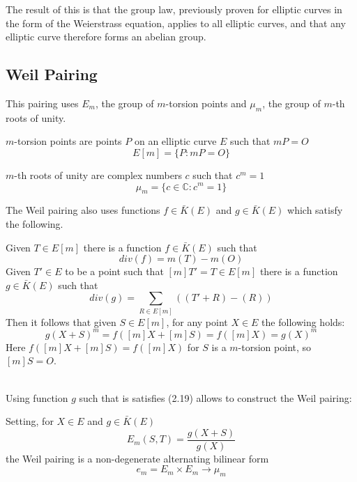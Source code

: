 The result of this is that the group law, previously proven for elliptic curves in the form of the Weierstrass equation, applies to all elliptic curves, and that any elliptic curve therefore forms an abelian group.

\subsection{Weil Pairing}
This pairing uses $E_m$, the group of $m$-torsion points and $\mu_m$, the group of $m$-th roots of unity.
\begin{defn}
	$m$-torsion points are points $P$ on an elliptic curve $E$ such that $mP=O$
	\begin{equation*}
	E[m]=\{P:mP=O\}
	\end{equation*}
\end{defn}
\begin{defn}
	$m$-th roots of unity are complex numbers $c$ such that $c^m=1$
	\begin{equation*}
	\mu_m=\{c\in\mathbb{C}:c^m=1\}
	\end{equation*}
\end{defn}
The Weil pairing also uses functions $f\in\bar{K}(E)$ and $g\in\bar{K}(E)$ which satisfy the following.
\begin{defn}
	Given $T\in E[m]$ there is a function $f\in\bar{K}(E)$ such that
	\begin{equation}
	div(f)=m(T)-m(O)
	\end{equation}
	Given $T'\in E$ to be a point such that $[m]T'=T\in E[m]$ there is a function $g\in\bar{K}(E)$ such that
	\begin{equation}
	div(g)=\sum_{R\in E[m]}((T'+R)-(R))
	\end{equation}
	Then it follows that given $S\in E[m]$, for any point $X\in E$ the following holds:
	\begin{equation}
	g(X+S)^m=f([m]X+[m]S)=f([m]X)=g(X)^m
	\end{equation}
	Here $f([m]X+[m]S)=f([m]X)$ for $S$ is a $m$-torsion point, so $[m]S=O$.
\end{defn}
\text\linebreak
\\
Using function $g$ such that is satisfies (2.19) allows to construct the Weil pairing:
\begin{defn}
	Setting, for $X\in E$ and $g\in\bar{K}(E)$
	\begin{equation} \label{wp}
	E_m(S,T)=\frac{g(X+S)}{g(X)}
	\end{equation}
	the Weil pairing is a non-degenerate alternating bilinear form
	\begin{equation*}
	e_m=E_m\times E_m\to\mu_m
	\end{equation*}
\end{defn}
